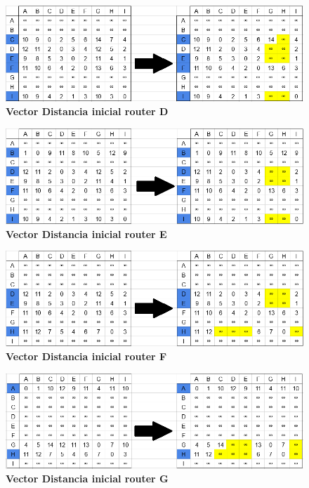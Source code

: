 \documentclass[12pt]{article}
\begin{document}
\begin{figure}[H] 
\includegraphics[width=1\textwidth]{imagenes/3inicialD.png} \caption{\small \textbf{Vector Distancia inicial router D}}
\label{fig:diagrama_58} 
\end{figure}
\begin{figure}[H] 
\includegraphics[width=1\textwidth]{imagenes/3inicialE.png} \caption{\small \textbf{Vector Distancia inicial router E}}
\label{fig:diagrama_59} 
\end{figure}
\begin{figure}[H] 
\includegraphics[width=1\textwidth]{imagenes/3inicialF.png} \caption{\small \textbf{Vector Distancia inicial router F}}
\label{fig:diagrama_60} 
\end{figure}
\begin{figure}[H] 
\includegraphics[width=1\textwidth]{imagenes/3inicialG.png} \caption{\small \textbf{Vector Distancia inicial router G}}
\label{fig:diagrama_61} 
\end{figure}
\end{document}
